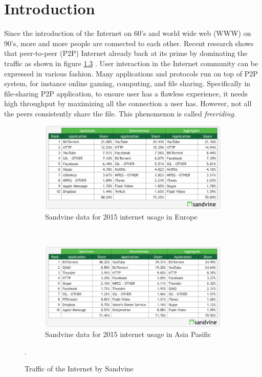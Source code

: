 \chapter{Introduction}
\label{chp:introduction}
Since the introduction of the Internet on 60's and world wide web (WWW) on 90's, more and more people are connected to each other. Recent research shows that peer-to-peer (P2P) Internet already back at its prime by dominating the traffic as shown in figure \ref{fig:usage} \cite{2015:internettraffic:sandvine}. User interaction in the Internet community can be expressed in various fashion. Many applications and protocols run on top of P2P system, for instance online gaming, computing, and file sharing. Specifically in file-sharing P2P application, to ensure user has a flawless experience, it needs high throughput by maximizing all the connection a user has. However, not all the peers consistently share the file. This phenomenon is called \textit{freeriding}.

\begin{figure}[h]
	\centering
	\begin{subfigure}[b]{0.8\textwidth}
		\includegraphics[width=\linewidth]{pics/sandvineeu2015}
		\caption{Sandvine data for 2015 internet usage in Europe}
		\label{fig:usage1}
	\end{subfigure}\\
	\begin{subfigure}[b]{0.8\textwidth}
		\includegraphics[width=\linewidth]{pics/sandvineasia2015}
		\caption{Sandvine data for 2015 internet usage in Asia Pasific}
		\label{fig:usage2}
	\end{subfigure}%
	\caption{Traffic of the Internet by Sandvine \cite{2015:internettraffic:sandvine}}.
	\label{fig:usage}
\end{figure}

